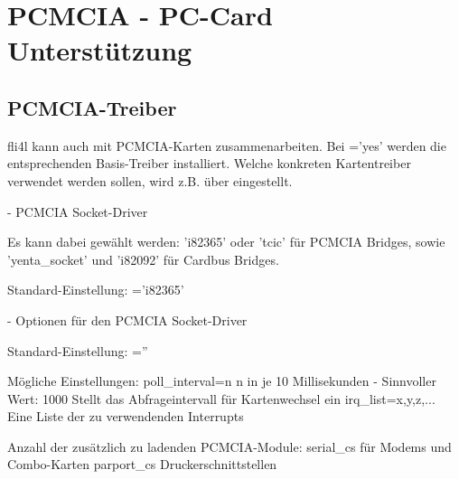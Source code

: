 {
\section {PCMCIA - PC-Card Unterstützung}
}

           
\subsection{PCMCIA-Treiber}

    fli4l kann auch mit PCMCIA-Karten zusammenarbeiten. Bei
        ='yes' werden die entsprechenden Basis-Treiber installiert.
    Welche konkreten Kartentreiber verwendet werden sollen, wird z.B.
    über  eingestellt.

\begin{description}
 - PCMCIA Socket-Driver

Es kann dabei gewählt werden: 'i82365' oder 'tcic' für PCMCIA Bridges, sowie 'yenta\_socket'
und 'i82092' für Cardbus Bridges.

        Standard-Einstellung: ='i82365'


 - Optionen für den PCMCIA Socket-Driver

        Standard-Einstellung: =''

        Mögliche Einstellungen:
                poll\_interval=n        n in je 10 Millisekunden - Sinnvoller Wert: 1000
                                        Stellt das Abfrageintervall für Kartenwechsel ein
                irq\_list=x,y,z,...     Eine Liste der zu verwendenden Interrupts


        Anzahl der zusätzlich zu ladenden PCMCIA-Module:
                serial\_cs		für Modems und Combo-Karten
                parport\_cs             Druckerschnittstellen
                
\end{description}
